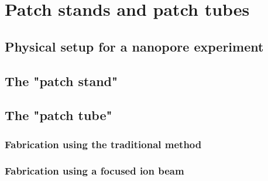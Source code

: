 \chapter{Patch stands and patch tubes}
\label{patch_stands_tubes}

\section{Physical setup for a nanopore experiment}

\section{The "patch stand"}

\section{The "patch tube"}

\subsection{Fabrication using the traditional method}

\subsection{Fabrication using a focused ion beam}
